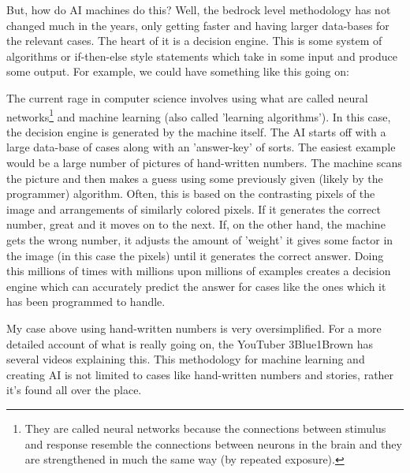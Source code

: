 But, how do AI machines do this? Well, the bedrock level methodology has not changed much in the years, only getting faster and having larger data-bases for the relevant cases. The heart of it is a decision engine. This is some system of algorithms or if-then-else style statements which take in some input and produce some output. For example, we could have something like this going on:


The current rage in computer science involves using what are called neural networks\footnote{They are called neural networks because the connections between stimulus and response resemble the connections between neurons in the brain and they are strengthened in much the same way (by repeated exposure).}  and machine learning (also called 'learning algorithms'). In this case, the decision engine is generated by the machine itself. The AI starts off with a large data-base of cases along with an 'answer-key' of sorts. The easiest example would be a large number of pictures of hand-written numbers. The machine scans the picture and then makes a guess using some previously given (likely by the programmer) algorithm. Often, this is based on the contrasting pixels of the image and arrangements of similarly colored pixels. If it generates the correct number, great and it moves on to the next. If, on the other hand, the machine gets the wrong number, it adjusts the amount of 'weight' it gives some factor in the image (in this case the pixels) until it generates the correct answer. Doing this millions of times with millions upon millions of examples creates a decision engine which can accurately predict the answer for cases like the ones which it has been programmed to handle. 

My case above using hand-written numbers is very oversimplified. For a more detailed account of what is really going on, the YouTuber 3Blue1Brown has several videos explaining this.\autocite{BlueBrown}  This methodology for machine learning and creating AI is not limited to cases like hand-written numbers and stories, rather it's found all over the place.


